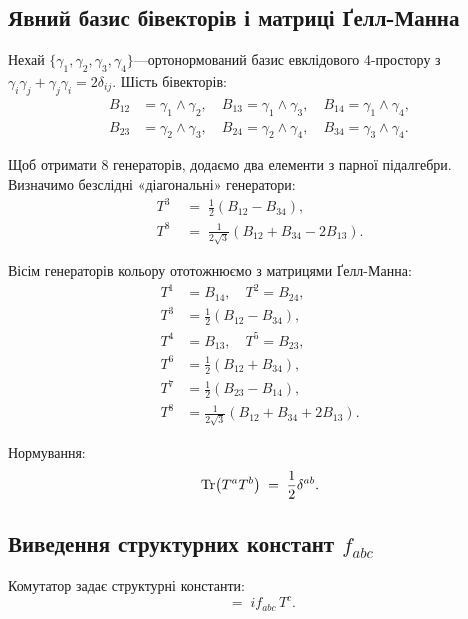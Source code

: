 \documentclass[11pt,a4paper]{article}
\theoremstyle{definition}
\theoremstyle{plain}
\theoremstyle{remark}
\begin{document}
\subsection{Явний базис бівекторів і матриці Ґелл-Манна}

Нехай $\{\gamma_1,\gamma_2,\gamma_3,\gamma_4\}$—ортонормований базис евклідового 4-простору з $\gamma_i\gamma_j+\gamma_j\gamma_i=2\delta_{ij}$. Шість бівекторів:
\begin{equation}
\begin{aligned}
B_{12}&=\gamma_1\wedge\gamma_2,\quad B_{13}=\gamma_1\wedge\gamma_3,\quad B_{14}=\gamma_1\wedge\gamma_4,\\
B_{23}&=\gamma_2\wedge\gamma_3,\quad B_{24}=\gamma_2\wedge\gamma_4,\quad B_{34}=\gamma_3\wedge\gamma_4.
\end{aligned}
\label{eq:bivector-basis-6d}
\end{equation}

Щоб отримати 8 генераторів, додаємо два елементи з парної підалгебри. Визначимо безслідні «діагональні» генератори:
\begin{align}
T^3 &\;=\; \frac{1}{2}(B_{12}-B_{34}), \\
T^8 &\;=\; \frac{1}{2\sqrt{3}}(B_{12}+B_{34}-2B_{13}).
\end{align}

Вісім генераторів кольору ототожнюємо з матрицями Ґелл-Манна:
\begin{align}
T^1 &= B_{14}, \quad T^2 = B_{24}, \nonumber \\
T^3 &= \frac{1}{2}(B_{12} - B_{34}), \nonumber \\
T^4 &= B_{13}, \quad T^5 = B_{23}, \nonumber \\
T^6 &= \frac{1}{2}(B_{12} + B_{34}), \nonumber \\
T^7 &= \frac{1}{2}(B_{23} - B_{14}), \nonumber \\
T^8 &= \frac{1}{2\sqrt{3}}(B_{12} + B_{34} + 2B_{13}).
\label{eq:color-generators}
\end{align}

Нормування:
\begin{equation}
\Tr(T^a T^b) \;=\; \frac{1}{2}\delta^{ab}.
\end{equation}

\subsection{Виведення структурних констант $f_{abc}$}

Комутатор задає структурні константи:
\begin{equation}
[T^a,T^b] \;=\; i f_{abc}\,T^c.
\label{eq:commutator}
\end{equation}
\end{document}

